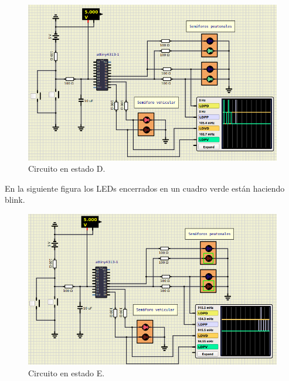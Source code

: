 \begin{figure}[H]
\centering
\includegraphics[scale=0.76]{./images/D.png} 
\caption{Circuito en estado D.}
\label{f1}
\end{figure}


En la siguiente figura los LEDs encerrados en un cuadro verde están haciendo blink.
\begin{figure}[H]
\centering
\includegraphics[scale=0.76]{./images/E.png} 
\caption{Circuito en estado E.}
\label{f1}
\end{figure}
